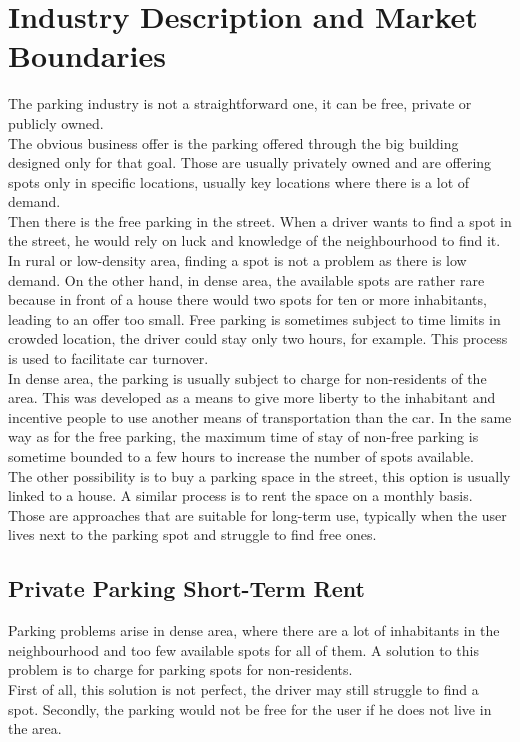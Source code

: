 \documentclass[12pt,a4paper,oneside]{book}
\begin{document}
\section{Industry Description and Market Boundaries}
The parking industry is not a straightforward one, it can be free, private or publicly owned.\\
The obvious business offer is the parking offered through the big building designed only for that goal. Those are usually privately owned and are offering spots only in specific locations, usually key locations where there is a lot of demand.\\
Then there is the free parking in the street. When a driver wants to find a spot in the street, he would rely on luck and knowledge of the neighbourhood to find it. In rural or low-density area, finding a spot is not a problem as there is low demand. On the other hand, in dense area, the available spots are rather rare because in front of a house there would two spots for ten or more inhabitants, leading to an offer too small. Free parking is sometimes subject to time limits in crowded location, the driver could stay only two hours, for example. This process is used to facilitate car turnover.\\
In dense area, the parking is usually subject to charge for non-residents of the area. This was developed as a means to give more liberty to the inhabitant and incentive people to use another means of transportation than the car.\cite{nycar} In the same way as for the free parking, the maximum time of stay of non-free parking is sometime bounded to a few hours to increase the number of spots available.\cite{bxpay} \\
The other possibility is to buy a parking space in the street, this option is usually linked to a house. A similar process is to rent the space on a monthly basis. Those are approaches that are suitable for long-term use, typically when the user lives next to the parking spot and struggle to find free ones.

\subsection{Private Parking Short-Term Rent}
Parking problems arise in dense area, where there are a lot of inhabitants in the neighbourhood and too few available spots for all of them. A solution to this problem is to charge for parking spots for non-residents.\\
First of all, this solution is not perfect, the driver may still struggle to find a spot. Secondly, the parking would not be free for the user if he does not live in the area.\\
\end{document}
